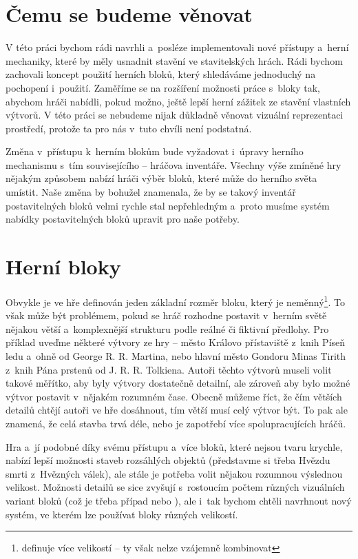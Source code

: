 \section{Čemu se budeme věnovat}
V této práci bychom rádi navrhli a~posléze implementovali nové přístupy a~herní mechaniky, které by měly usnadnit stavění ve stavitelských hrách. Rádi bychom zachovali koncept použití herních bloků, který shledáváme jednoduchý na pochopení i~použití. Zaměříme se na rozšíření možnosti práce s~bloky tak, abychom hráči nabídli, pokud možno, ještě lepší herní zážitek ze stavění vlastních výtvorů. V této práci se nebudeme nijak důkladně věnovat vizuální reprezentaci prostředí, protože ta pro nás v~tuto chvíli není podstatná.

Změna v~přístupu k~herním blokům bude vyžadovat i~úpravy herního mechanismu s~tím souvisejícího -- hráčova inventáře. Všechny výše zmíněné hry nějakým způsobem nabízí hráči výběr bloků, které může do herního světa umístit. Naše změna by bohužel znamenala, že by se takový inventář postavitelných bloků velmi rychle stal nepřehledným a~proto musíme systém nabídky postavitelných bloků upravit pro naše potřeby.


\section{Herní bloky}
Obvykle je ve hře definován jeden základní rozměr bloku, který je neměnný\footnote{\SE{} definuje více velikostí -- ty však nelze vzájemně kombinovat}. To však může být problémem, pokud se hráč rozhodne postavit v~herním světě nějakou větší a~komplexnější strukturu podle reálné či fiktivní předlohy. Pro příklad uveďme některé výtvory ze hry \MC{} -- město Královo přístaviště z~knih Píseň ledu a~ohně od George R. R. Martina, nebo hlavní město Gondoru Minas Tirith z~knih Pána prstenů od J. R. R. Tolkiena. Autoři těchto výtvorů museli volit takové měřítko, aby byly výtvory dostatečně detailní, ale zároveň aby bylo možné výtvor postavit v~nějakém rozumném čase. Obecně můžeme říct, že čím větších detailů chtějí autoři ve hře \MC{} dosáhnout, tím větší musí celý výtvor být. To pak ale znamená, že celá stavba trvá déle, nebo je zapotřebí více spolupracujících hráčů. 

Hra \SE{} a~jí podobné díky svému přístupu a~více bloků, které nejsou tvaru krychle, nabízí lepší možnosti staveb rozsáhlých objektů (představme si třeba Hvězdu smrti z~Hvězných válek), ale stále je potřeba volit nějakou rozumnou výslednou velikost. Možnosti detailů se sice zvyšují s~rostoucím počtem různých vizuálních variant bloků (což je třeba případ \SE{} nebo \NI{}), ale i~tak bychom chtěli navrhnout nový systém, ve kterém lze používat bloky různých velikostí.




